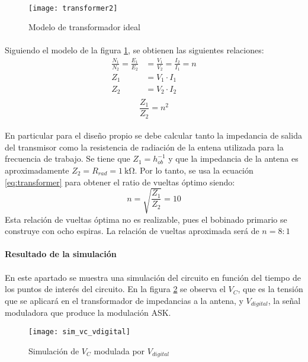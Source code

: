 \paragraph{}
\begin{figure}[h!]
    \centering
    \texttt{[image: transformer2]}
    \caption{Modelo de transformador ideal}
    \label{fig:transformer}
\end{figure}
\paragraph{}
Siguiendo el modelo de la figura \ref{fig:transformer}, se obtienen las siguientes relaciones:
\begin{align*}
   \frac{N_1}{N_2} = \frac{E_1}{E_2} &= \frac{V_1}{V_2} = \frac{I_2}{I_1} = n \\
   Z_1 &= V_1 \cdot I_1 \\
   Z_2 &= V_2 \cdot I_2 \\
\end{align*}
\begin{equation}
   \label{eq:transformer}
   \frac{Z_1}{Z_2} = n^2 
\end{equation}
\paragraph{}
En particular para el diseño propio se debe calcular tanto la impedancia de salida del transmisor como la resistencia de radiación de la entena utilizada para la frecuencia de trabajo.
Se tiene que $Z_1 = h_{ob}^{-1}$ y que la impedancia de la antena es aproximadamente $Z_2 = R_{rad} = \SI{1}{\kilo\ohm}$.
Por lo tanto, se usa la ecuaci\'on \ref{eq:transformer} para obtener el ratio de vueltas óptimo siendo: $$ n = \sqrt{\frac{Z_1}{Z_2}} = 10 $$
Esta relación de vueltas óptima no es realizable, pues el bobinado primario se construye con ocho espiras. La relación de vueltas aproximada será de $ n = 8:1 $


\paragraph{Resultado de la simulaci\'on} %
\paragraph{}
En este apartado se muestra una simulación del circuito en función del tiempo de los puntos de interés del circuito. 
En la figura \ref{fig:sim_vc_vdig} se observa el $V_C$, que es la tensión que se aplicará en el transformador de impedancias a la antena, y $V_{digital}$, la señal moduladora que produce la modulación ASK. 
\begin{figure}[h]
    \centering
    \texttt{[image: sim\_vc\_vdigital]}
    \caption{Simulaci\'on de $V_C$ modulada por $V_{digital}$}
    \label{fig:sim_vc_vdig}
\end{figure}
